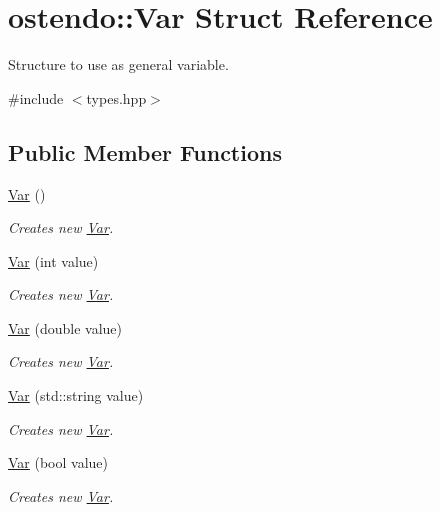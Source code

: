 \hypertarget{structostendo_1_1Var}{}\section{ostendo\+:\+:Var Struct Reference}
\label{structostendo_1_1Var}


Structure to use as general variable.  




{\ttfamily \#include $<$types.\+hpp$>$}

\subsection*{Public Member Functions}
\begin{DoxyCompactItemize}
\item 
\hyperlink{structostendo_1_1Var_addaf85e46b9bfd2d98b5bc8200b06c5b}{Var} ()
\begin{DoxyCompactList}\small\item\em Creates new \hyperlink{structostendo_1_1Var}{Var}. \end{DoxyCompactList}\item 
\hyperlink{structostendo_1_1Var_a271aecf1954157dc34985a7a2ef506b9}{Var} (int value)
\begin{DoxyCompactList}\small\item\em Creates new \hyperlink{structostendo_1_1Var}{Var}. \end{DoxyCompactList}\item 
\hyperlink{structostendo_1_1Var_a77cedab74802b291425fddee5465df39}{Var} (double value)
\begin{DoxyCompactList}\small\item\em Creates new \hyperlink{structostendo_1_1Var}{Var}. \end{DoxyCompactList}\item 
\hyperlink{structostendo_1_1Var_a6af5058ed312a3860389b3a15947aacd}{Var} (std\+::string value)
\begin{DoxyCompactList}\small\item\em Creates new \hyperlink{structostendo_1_1Var}{Var}. \end{DoxyCompactList}\item 
\hyperlink{structostendo_1_1Var_a1c3bc2ea850b6748989a70f82f73c62a}{Var} (bool value)
\begin{DoxyCompactList}\small\item\em Creates new \hyperlink{structostendo_1_1Var}{Var}. \end{DoxyCompactList}\item 

\end{DoxyCompactItemize}
